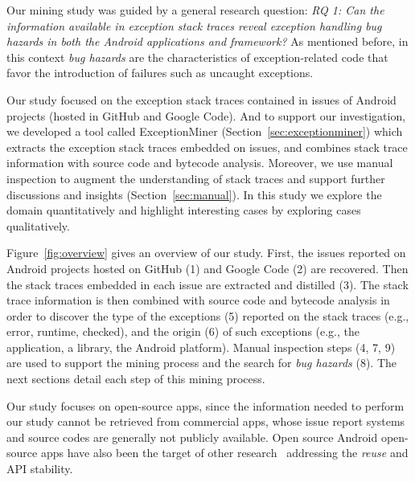 Our mining study was guided by a general research question: \emph{RQ 1: Can the information available in exception stack traces 
 reveal exception handling \emph{bug hazards} in both the Android applications and framework?}
As mentioned before, in this context \emph{bug hazards} are the characteristics of exception-related code 
that favor the introduction of failures such as uncaught exceptions. 

Our study focused on the exception stack traces contained in issues of Android projects (hosted in GitHub and Google Code).
And to support our investigation, we developed a tool called ExceptionMiner (Section~\ref{sec:exceptionminer})
which extracts the exception stack traces embedded on issues, 
and combines stack trace information with source code and bytecode 
analysis. Moreover, we use manual inspection to augment
 the understanding of stack traces and support further discussions and insights (Section~\ref{sec:manual}).
In this study we explore the domain quantitatively and highlight interesting cases by 
exploring cases qualitatively. 


Figure~\ref{fig:overview} gives an overview of our study.
First,  the issues reported on Android projects hosted on GitHub (1) and Google Code (2) are recovered.
Then the stack traces embedded in each issue are extracted and distilled (3).
The stack trace information is then combined with source code and bytecode analysis in order to discover 
the type of the exceptions (5) reported on the stack traces (e.g., error, runtime, checked),
and the origin (6) of such exceptions 
(e.g., the application, a library, the Android platform). 
Manual inspection steps (4, 7, 9) are used to support the mining process  and 
the search for \emph{bug hazards}  (8). The next sections detail each step of this mining process.

Our study focuses on open-source apps, since the information needed to perform our study
cannot be retrieved from commercial apps, whose issue report systems and 
source codes are generally not publicly available. 
Open source Android open-source apps have also been the 
target of other research~\cite{Linar13,Ruiz12} addressing the \emph{reuse} and API stability. 



